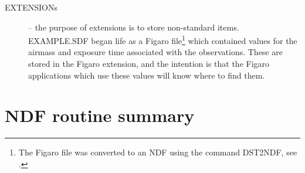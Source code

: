 \begin{description}
\item[{EXTENSIONs}] -- the purpose of extensions is to store non-standard
items. EXAMPLE.SDF began life as a Figaro file\footnote{The Figaro file was 
converted to an NDF using the command DST2NDF, see .}
which contained values
for the airmass and exposure time associated with the observations.
These are stored in the Figaro extension, and the intention is that the
Figaro applications which 
use these values will know where to find them.
\end{description}

\newpage
\newcommand{\japp}[2]{\item{\tt\hspace*{-5mm} #1} -- {#2}}
\section{NDF routine summary\label{apxrod}}


